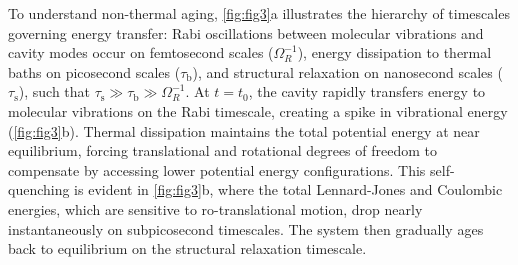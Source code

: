 \documentclass[%
 reprint,
 amsmath,amssymb,
 aps,
]{revtex4-2}
\begin{document}
To understand non-thermal aging, \cref{fig:fig3}a illustrates the hierarchy of timescales governing energy transfer: Rabi oscillations between molecular vibrations and cavity modes occur on femtosecond scales ($\Omega_R^{-1}$), energy dissipation to thermal baths on picosecond scales ($\tau_\mathrm{b}$), and structural relaxation on nanosecond scales ($\tau_\mathrm{s}$), such that $\tau_\mathrm{s} \gg \tau_\mathrm{b} \gg \Omega_R^{-1}$.
At $t = t_0$, the cavity rapidly transfers energy to molecular vibrations on the Rabi timescale, creating a spike in vibrational energy (\cref{fig:fig3}b).
Thermal dissipation maintains the total potential energy at near equilibrium, forcing translational and rotational degrees of freedom to compensate by accessing lower potential energy configurations.
This self-quenching is evident in \cref{fig:fig3}b, where the total Lennard-Jones and Coulombic energies, which are sensitive to ro-translational motion, drop nearly instantaneously on subpicosecond timescales.
The system then gradually ages back to equilibrium on the structural relaxation timescale.

\end{document}
